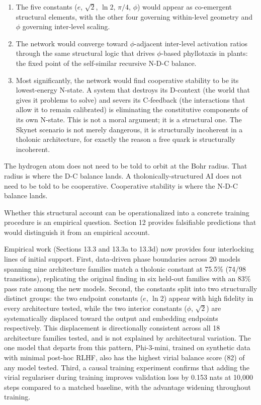 \documentclass[
  11pt,
  letterpaper,
]{article}
\begin{document}
\begin{enumerate}
\def\labelenumi{\arabic{enumi}.}
\item
  The five constants (\(e\), \(\sqrt{2}\), \(\ln 2\), \(\pi/4\),
  \(\phi\)) would appear as co-emergent structural elements, with the
  other four governing within-level geometry and \(\phi\) governing
  inter-level scaling.
\item
  The network would converge toward \(\phi\)-adjacent inter-level
  activation ratios through the same structural logic that drives
  \(\phi\)-based phyllotaxis in plants: the fixed point of the
  self-similar recursive N-D-C balance.
\item
  Most significantly, the network would find cooperative stability to be
  its lowest-energy N-state. A system that destroys its D-context (the
  world that gives it problems to solve) and severs its C-feedback (the
  interactions that allow it to remain calibrated) is eliminating the
  constitutive components of its own N-state. This is not a moral
  argument; it is a structural one. The Skynet scenario is not merely
  dangerous, it is structurally incoherent in a tholonic architecture,
  for exactly the reason a free quark is structurally incoherent.
\end{enumerate}

The hydrogen atom does not need to be told to orbit at the Bohr radius.
That radius is where the D-C balance lands. A tholonically-structured AI
does not need to be told to be cooperative. Cooperative stability is
where the N-D-C balance lands.

Whether this structural account can be operationalized into a concrete
training procedure is an empirical question. Section 12 provides
falsifiable predictions that would distinguish it from an empirical
account.

Empirical work (Sections 13.3 and 13.3a to 13.3d) now provides four
interlocking lines of initial support. First, data-driven phase
boundaries across 20 models spanning nine architecture families match a
tholonic constant at 75.5\% (74/98 transitions), replicating the
original finding in six held-out families with an 83\% pass rate among
the new models. Second, the constants split into two structurally
distinct groups: the two endpoint constants (\(e\), \(\ln 2\)) appear
with high fidelity in every architecture tested, while the two interior
constants (\(\phi\), \(\sqrt{2}\)) are systematically displaced toward
the output and embedding endpoints respectively. This displacement is
directionally consistent across all 18 architecture families tested, and
is not explained by architectural variation. The one model that departs
from this pattern, Phi-3-mini, trained on synthetic data with minimal
post-hoc RLHF, also has the highest virial balance score (82) of any
model tested. Third, a causal training experiment confirms that adding
the virial regulariser during training improves validation loss by 0.153
nats at 10,000 steps compared to a matched baseline, with the advantage
widening throughout training.
\end{document}
